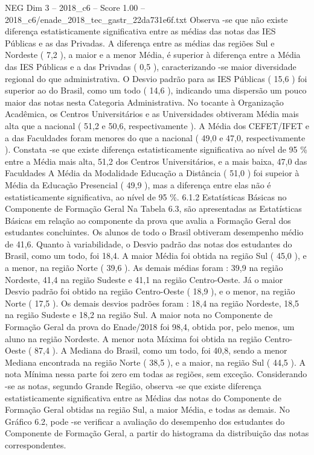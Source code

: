 \begin{textsample}{NEG Dim 3 – 2018\_c6 – Score 1.00 – 2018\_c6/enade\_2018\_tec\_gastr\_22da731e6f.txt}
Observa -se que não existe diferença estatisticamente significativa entre as médias das notas das IES Públicas e as das Privadas.
A diferença entre as médias das regiões Sul e Nordeste ( 7,2 ), a maior e a menor Média, é superior à diferença entre a Média das IES Públicas e a das Privadas ( 0,5 ), caracterizando -se maior diversidade regional do que administrativa.
O Desvio padrão para as IES Públicas ( 15,6 ) foi superior ao do Brasil, como um todo ( 14,6 ), indicando uma dispersão um pouco maior das notas nesta Categoria Administrativa.
No tocante à Organização Acadêmica, os Centros Universitários e as Universidades obtiveram Média mais alta que a nacional ( 51,2 e 50,6, respectivamente ).
A Média dos CEFET/IFET e a das Faculdades foram menores do que a nacional ( 49,0 e 47,0, respectivamente ).
Constata -se que existe diferença estatisticamente significativa ao nível de 95 \% entre a Média mais alta, 51,2 dos Centros Universitários, e a mais baixa, 47,0 das Faculdades A Média da Modalidade Educação a Distância ( 51,0 ) foi supeior à Média da Educação Presencial ( 49,9 ), mas a diferença entre elas não é estatisticamente significativa, ao nível de 95 \%. 6.1.2 Estatísticas Básicas no Componente de Formação Geral Na Tabela 6.3, são apresentadas as Estatísticas Básicas em relação ao componente da prova que avalia a Formação Geral dos estudantes concluintes.
Os alunos de todo o Brasil obtiveram desempenho médio de 41,6.
Quanto à variabilidade, o Desvio padrão das notas dos estudantes do Brasil, como um todo, foi 18,4.
A maior Média foi obtida na região Sul ( 45,0 ), e a menor, na região Norte ( 39,6 ).
As demais médias foram : 39,9 na região Nordeste, 41,4 na região Sudeste e 41,1 na região Centro-Oeste.
Já o maior Desvio padrão foi obtido na região Centro-Oeste ( 18,9 ), e o menor, na região Norte ( 17,5 ).
Os demais desvios padrões foram : 18,4 na região Nordeste, 18,5 na região Sudeste e 18,2 na região Sul.
A maior nota no Componente de Formação Geral da prova do Enade/2018 foi 98,4, obtida por, pelo menos, um aluno na região Nordeste.
A menor nota Máxima foi obtida na região Centro-Oeste ( 87,4 ).
A Mediana do Brasil, como um todo, foi 40,8, sendo a menor Mediana encontrada na região Norte ( 38,5 ), e a maior, na região Sul ( 44,5 ).
A nota Mínima nessa parte foi zero em todas as regiões, sem exceção.
Considerando -se as notas, segundo Grande Região, observa -se que existe diferença estatisticamente significativa entre as Médias das notas do Componente de Formação Geral obtidas na região Sul, a maior Média, e todas as demais.
No Gráfico 6.2, pode -se verificar a avaliação do desempenho dos estudantes do Componente de Formação Geral, a partir do histograma da distribuição das notas correspondentes.

\end{textsample}
